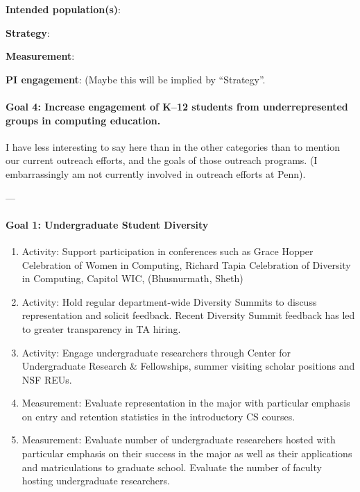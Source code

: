 \textbf{Intended population(s)}:

\textbf{Strategy}:

\textbf{Measurement}:

\textbf{PI engagement}: (Maybe this will be implied by ``Strategy''.

\paragraph*{Goal 4: Increase engagement of K--12 students from underrepresented
groups in computing education.}

I have less interesting to say here than in the other categories than to mention
our current outreach efforts, and the goals of those outreach programs. (I
embarrassingly am not currently involved in outreach efforts at Penn).

---

\paragraph*{Goal 1: Undergraduate Student Diversity}

\begin{enumerate}
\item Activity: Support participation in conferences such as Grace Hopper Celebration of Women in Computing, Richard Tapia Celebration of Diversity in Computing, Capitol WIC, (Bhusnurmath, Sheth)
\item Activity: Hold regular department-wide Diversity Summits to discuss representation and solicit feedback. Recent Diversity Summit feedback has led to greater transparency in TA hiring.
\item Activity: Engage undergraduate researchers through Center for Undergraduate Research \& Fellowships, summer visiting scholar positions and NSF REUs.
\item Measurement: Evaluate representation in the major with particular emphasis on entry and retention statistics in the introductory CS courses.
\item Measurement: Evaluate number of undergraduate researchers hosted with particular emphasis on their success in the major as well as their applications and matriculations to graduate school. Evaluate the number of faculty hosting undergraduate researchers.
\end{enumerate}

